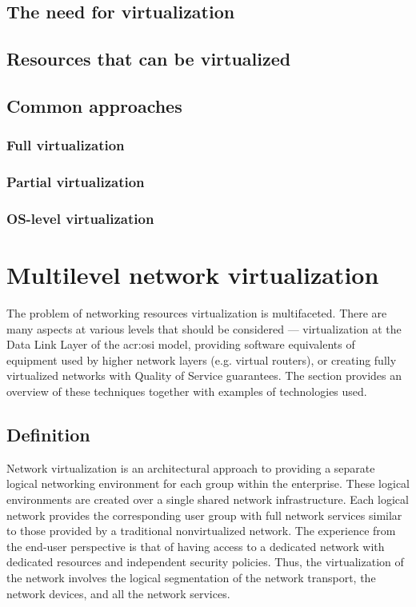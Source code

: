 \documentclass[11pt]{book}
\begin{document}

      \subsection{The need for virtualization}

      \subsection{Resources that can be virtualized}

      \subsection{Common approaches}

        \subsubsection{Full virtualization}

        \subsubsection{Partial virtualization}

        \subsubsection{OS-level virtualization}


    \section{Multilevel network virtualization}

      The problem of networking resources virtualization is multifaceted. There are many aspects at various levels that
      should be considered --- virtualization at the Data Link Layer of the \gls{acr:osi} model, providing software
      equivalents of equipment used by higher network layers (e.g. virtual routers), or creating fully virtualized
      networks with Quality of Service guarantees. The section provides an overview of these techniques together with
      examples of technologies used.

      \subsection{Definition} 

	Network virtualization is an architectural approach to providing a separate logical networking environment for each 
	group within the enterprise. These logical environments are created over a single shared network infrastructure. 
	Each logical network provides the corresponding user group with full network services similar to those provided by 
	a traditional nonvirtualized network. The experience from the end-user perspective is that of having access to a
	 dedicated network with dedicated resources and independent security policies. Thus, the virtualization of the 
	network involves the logical segmentation of the network transport, the network devices, and all the network 
	services. \cite{network_virt}
\end{document}
